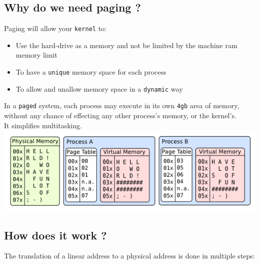 \documentclass{42-en}
\begin{document}
	\subsection{Why do we need paging ?}
	Paging will allow your \texttt{kernel} to:

	\begin{itemize}\itemsep1pt
		\item Use the hard-drive as a memory and not be limited by the machine
		ram memory limit
		\item To have a \texttt{unique} memory space for each process
		\item To allow and unallow memory space in a \texttt{dynamic} way
	\end{itemize}

	In a \texttt{paged} system, each process may execute in its own \texttt{4gb}
	area of memory, without any chance of effecting any other process's memory,
	or the kernel's.\\
	It simplifies multitasking.\\
	\includegraphics[width=16cm]{./processes.png}

	\subsection{How does it work ?}
	The translation of a linear address to a physical address is done
	in multiple steps:
\end{document}
